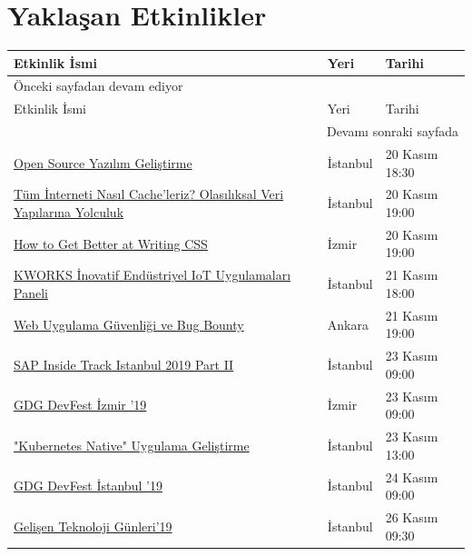 \documentclass[11pt]{article}
\begin{document}
\section{Yaklaşan Etkinlikler}
\label{sec:orgfb4002a}
\begin{longtable}{|p{8cm}|l|l|}
\hline
Etkinlik İsmi & Yeri & Tarihi\\
\hline
\endfirsthead
\multicolumn{3}{l}{Önceki sayfadan devam ediyor} \\
\hline

Etkinlik İsmi & Yeri & Tarihi \\

\hline
\endhead
\hline\multicolumn{3}{r}{Devamı sonraki sayfada} \\
\endfoot
\endlastfoot
\hline
\href{https://www.eventbrite.com/e/open-source-yazlm-gelistirme-akaunting-kurucu-ortag-denis-dulici-tickets-79951076823}{Open Source Yazılım Geliştirme} & İstanbul & 20 Kasım 18:30\\
\href{https://kommunity.com/software-craftsmanship-turkey/events/tum-interneti-nasil-cacheleriz-olasiliksal-veri-yapilarina-yolculuk}{Tüm İnterneti Nasıl Cache'leriz? Olasılıksal Veri Yapılarına Yolculuk} & İstanbul & 20 Kasım 19:00\\
\href{https://kommunity.com/atolye15/events/how-to-get-better-at-writing-css}{How to Get Better at Writing CSS} & İzmir & 20 Kasım 19:00\\
\href{https://www.eventbrite.com/e/kworks-inovatif-endustriyel-iot-uygulamalar-paneli-tickets-80823638679}{KWORKS İnovatif Endüstriyel IoT Uygulamaları Paneli} & İstanbul & 21 Kasım 18:00\\
\href{https://www.eventbrite.com/e/web-uygulama-guvenligi-ve-bug-bounty-hacknightsorg-tickets-78021938719}{Web Uygulama Güvenliği ve Bug Bounty} & Ankara & 21 Kasım 19:00\\
\href{https://kommunity.com/sap-community-turkey/events/sap-inside-track-istanbul-2019-part-ii}{SAP Inside Track Istanbul 2019 Part II} & İstanbul & 23 Kasım 09:00\\
\href{https://www.eventbrite.com/e/gdg-devfest-izmir-19-tickets-75047965485}{GDG DevFest İzmir '19} & İzmir & 23 Kasım 09:00\\
\href{https://kommunity.com/istanbulphp/events/kubernetes-native-uygulama-gelistirme}{"Kubernetes Native" Uygulama Geliştirme} & İstanbul & 23 Kasım 13:00\\
\href{https://devfest.istanbul/}{GDG DevFest İstanbul '19} & İstanbul & 24 Kasım 09:00\\
\href{https://www.eventbrite.com/e/gelisen-teknoloji-gunleri19-tickets-82196167951}{Gelişen Teknoloji Günleri'19} & İstanbul & 26 Kasım 09:30\\

\end{longtable}
\end{document}
